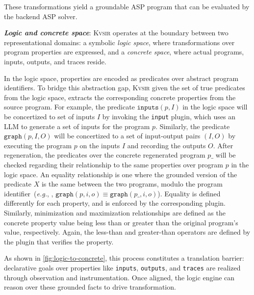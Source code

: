 \documentclass[nonacm,sigplan,review]{acmart}
\def\eg{{\em e.g.}, }
\newcommand{\sys}{{\scshape Kv{\textalpha}sir}\xspace}
\newcommand{\heading}[1]{\vspace{2pt}\noindent\textbf{\emph{#1}}:\enspace}
\begin{document}
These transformations yield a groundable ASP program that can be evaluated by the backend ASP solver.

\heading{Logic and concrete space}
\sys operates at the boundary between two representational domains: a symbolic
\emph{logic space}, where transformations over program properties are expressed, and
a \emph{concrete space}, where actual programs, inputs, outputs, and traces
reside.

In the logic space, properties are encoded as predicates over abstract program
identifiers.
To bridge this abstraction gap, \sys given the set of true predicates
from the logic space, extracts the corresponding concrete properties from the
source program.
For example, the predicate $\texttt{inputs}(p, I)$ in the logic space
will be concertized to set of inputs $I$ by invoking the \texttt{input} plugin,
which uses an LLM to generate a set of inputs for the program $p$.
Similarly, the predicate $\texttt{graph}(p, I, O)$ will be concertized to a set of
input-output pairs $(I, O)$ by executing the program $p$ on the inputs $I$ and
recording the outputs $O$.
After regeneration, the predicates over the concrete regenerated program $p\_$
will be checked regarding their relationship to the same properties over program $p$
in the logic space.
An equality relationship is one where the grounded version of the predicate
$X$ is the same between the two programs, modulo the program identifier~(\eg, $\texttt{graph}(p, i, o) \equiv \texttt{graph}(p\_, i, o)$).
Equality is defined differently for each property, and is enforced by the corresponding plugin.
Similarly, minimization and maximization relationships are defined as
the concrete property value being less than or greater than the original program's value, respectively.
Again, the less-than and greater-than operators are defined by the plugin that verifies the property.


As shown in \cref{fig:logic-to-concrete}, this process constitutes a
translation barrier: declarative goals over properties like \texttt{inputs},
\texttt{outputs}, and \texttt{traces} are realized through observation and
instrumentation. Once aligned, the logic engine can reason over these grounded
facts to drive transformation.
\end{document}
